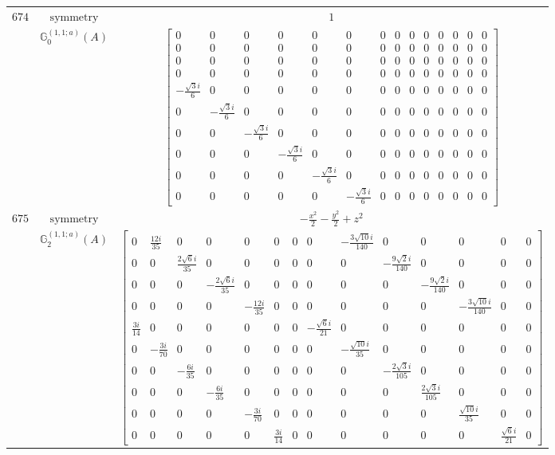 \documentclass[fleqn,8pt,landscape]{jsarticle}
\begin{document}
\begin{longtable}{ccc}
$ 674 $ & $ \text{symmetry} $ & $ 1 $ \\
$  $ & $ \mathbb{G}_{0}^{(1,1;a)}(A) $ & $ \begin{bmatrix} 0 & 0 & 0 & 0 & 0 & 0 & 0 & 0 & 0 & 0 & 0 & 0 & 0 & 0 \\ 0 & 0 & 0 & 0 & 0 & 0 & 0 & 0 & 0 & 0 & 0 & 0 & 0 & 0 \\ 0 & 0 & 0 & 0 & 0 & 0 & 0 & 0 & 0 & 0 & 0 & 0 & 0 & 0 \\ 0 & 0 & 0 & 0 & 0 & 0 & 0 & 0 & 0 & 0 & 0 & 0 & 0 & 0 \\ - \frac{\sqrt{3} i}{6} & 0 & 0 & 0 & 0 & 0 & 0 & 0 & 0 & 0 & 0 & 0 & 0 & 0 \\ 0 & - \frac{\sqrt{3} i}{6} & 0 & 0 & 0 & 0 & 0 & 0 & 0 & 0 & 0 & 0 & 0 & 0 \\ 0 & 0 & - \frac{\sqrt{3} i}{6} & 0 & 0 & 0 & 0 & 0 & 0 & 0 & 0 & 0 & 0 & 0 \\ 0 & 0 & 0 & - \frac{\sqrt{3} i}{6} & 0 & 0 & 0 & 0 & 0 & 0 & 0 & 0 & 0 & 0 \\ 0 & 0 & 0 & 0 & - \frac{\sqrt{3} i}{6} & 0 & 0 & 0 & 0 & 0 & 0 & 0 & 0 & 0 \\ 0 & 0 & 0 & 0 & 0 & - \frac{\sqrt{3} i}{6} & 0 & 0 & 0 & 0 & 0 & 0 & 0 & 0 \end{bmatrix} $ \\ \hline
$ 675 $ & $ \text{symmetry} $ & $ - \frac{x^{2}}{2} - \frac{y^{2}}{2} + z^{2} $ \\
$  $ & $ \mathbb{G}_{2}^{(1,1;a)}(A) $ & $ \begin{bmatrix} 0 & \frac{12 i}{35} & 0 & 0 & 0 & 0 & 0 & 0 & - \frac{3 \sqrt{10} i}{140} & 0 & 0 & 0 & 0 & 0 \\ 0 & 0 & \frac{2 \sqrt{6} i}{35} & 0 & 0 & 0 & 0 & 0 & 0 & - \frac{9 \sqrt{2} i}{140} & 0 & 0 & 0 & 0 \\ 0 & 0 & 0 & - \frac{2 \sqrt{6} i}{35} & 0 & 0 & 0 & 0 & 0 & 0 & - \frac{9 \sqrt{2} i}{140} & 0 & 0 & 0 \\ 0 & 0 & 0 & 0 & - \frac{12 i}{35} & 0 & 0 & 0 & 0 & 0 & 0 & - \frac{3 \sqrt{10} i}{140} & 0 & 0 \\ \frac{3 i}{14} & 0 & 0 & 0 & 0 & 0 & 0 & - \frac{\sqrt{6} i}{21} & 0 & 0 & 0 & 0 & 0 & 0 \\ 0 & - \frac{3 i}{70} & 0 & 0 & 0 & 0 & 0 & 0 & - \frac{\sqrt{10} i}{35} & 0 & 0 & 0 & 0 & 0 \\ 0 & 0 & - \frac{6 i}{35} & 0 & 0 & 0 & 0 & 0 & 0 & - \frac{2 \sqrt{3} i}{105} & 0 & 0 & 0 & 0 \\ 0 & 0 & 0 & - \frac{6 i}{35} & 0 & 0 & 0 & 0 & 0 & 0 & \frac{2 \sqrt{3} i}{105} & 0 & 0 & 0 \\ 0 & 0 & 0 & 0 & - \frac{3 i}{70} & 0 & 0 & 0 & 0 & 0 & 0 & \frac{\sqrt{10} i}{35} & 0 & 0 \\ 0 & 0 & 0 & 0 & 0 & \frac{3 i}{14} & 0 & 0 & 0 & 0 & 0 & 0 & \frac{\sqrt{6} i}{21} & 0 \end{bmatrix} $ \\ \hline

\end{longtable}
\end{document}
